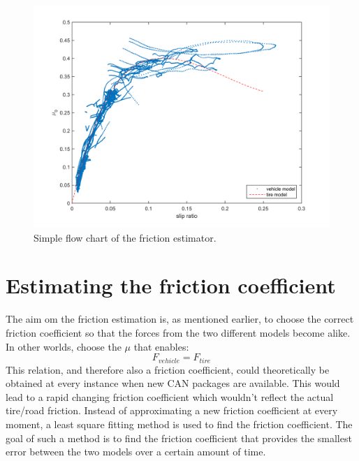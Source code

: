 \begin{figure}[h]
	\centering
	\includegraphics[width=1.0\textwidth]{Pictures/slip_kraft_is}
	\caption {Simple flow chart of the friction estimator.}
	\label{slip_kraft_is}
\end{figure}

\section{Estimating the friction coefficient}
The aim om the friction estimation is, as mentioned earlier, to choose the correct friction coefficient so that the forces from the two different models become alike. In other worlds, choose the $ \mu $ that enables:
\begin{equation}
	F_{vehicle} = F_{tire}
\end{equation}
This relation, and therefore also a friction coefficient, could theoretically be obtained at every instance when new CAN packages are available. This would lead to a rapid changing friction coefficient which wouldn't reflect the actual tire/road friction. Instead of approximating a new friction coefficient at every moment, a least square fitting method is used to find the friction coefficient. The goal of such a method is to find the friction coefficient that provides the smallest error between the two models over a certain amount of time. 

